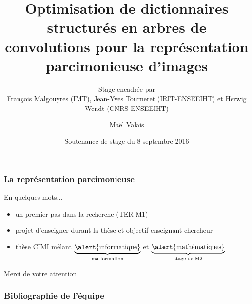 


\title{Optimisation de dictionnaires structurés en arbres de convolutions pour la représentation parcimonieuse d'images}
\subtitle{Stage encadrée par\\François Malgouyres (IMT), Jean-Yves Tourneret (IRIT-ENSEEIHT) et Herwig Wendt (CNRS-ENSEEIHT)}

\date{Soutenance de stage du 8 septembre 2016}
\author{Maël Valais}



\maketitle








\begin{frame}[label=LO]
\frametitle{La représentation parcimonieuse}

\end{frame}





\begin{frame}{En quelques mots...}
\begin{itemize}
\item un premier pas dans la recherche (TER M1)
\item projet d'\alert{enseigner} durant la thèse et objectif enseignant-chercheur
\item thèse CIMI mêlant $\underbrace{\text{\alert{informatique}}}_{\text{ma formation}}$ et $\underbrace{\text{\alert{mathématiques}}}_{\text{stage de M2}}$
\end{itemize}
\vfill
\hfill Merci de votre attention
\end{frame}

\appendix

\begin{frame}
\frametitle{Bibliographie de l'équipe}
\nocite{*}
\printbibliography[heading=none]
\end{frame}


